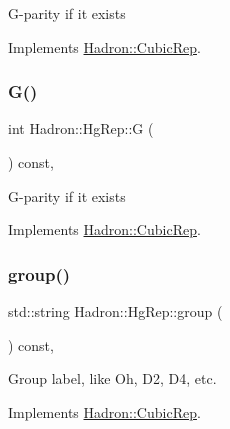 G-\/parity if it exists 

Implements \mbox{\hyperlink{structHadron_1_1CubicRep_a52104e43266d1614c00bbd1c3b395458}{Hadron\+::\+Cubic\+Rep}}.

\mbox{\label{structHadron_1_1HgRep_a80baf377b3f2e8d633bba539efea8d04}} 
\subsubsection{\texorpdfstring{G()}{G()}\hspace{0.1cm}{\footnotesize\ttfamily [3/3]}}
{\footnotesize\ttfamily int Hadron\+::\+Hg\+Rep\+::G (\begin{DoxyParamCaption}{ }\end{DoxyParamCaption}) const\hspace{0.3cm}{\ttfamily [inline]}, {\ttfamily [virtual]}}

G-\/parity if it exists 

Implements \mbox{\hyperlink{structHadron_1_1CubicRep_a52104e43266d1614c00bbd1c3b395458}{Hadron\+::\+Cubic\+Rep}}.

\mbox{\label{structHadron_1_1HgRep_a271e1ec9a6f40512f32c8c573e42dff7}} 
\subsubsection{\texorpdfstring{group()}{group()}\hspace{0.1cm}{\footnotesize\ttfamily [1/3]}}
{\footnotesize\ttfamily std\+::string Hadron\+::\+Hg\+Rep\+::group (\begin{DoxyParamCaption}{ }\end{DoxyParamCaption}) const\hspace{0.3cm}{\ttfamily [inline]}, {\ttfamily [virtual]}}

Group label, like Oh, D2, D4, etc. 

Implements \mbox{\hyperlink{structHadron_1_1CubicRep_a0748f11ec87f387062c8e8981339a29c}{Hadron\+::\+Cubic\+Rep}}.

\mbox{\label{structHadron_1_1HgRep_a271e1ec9a6f40512f32c8c573e42dff7}} 
